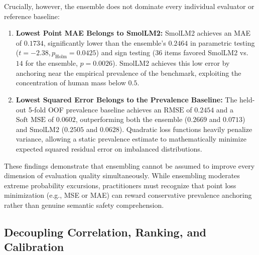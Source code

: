 Crucially, however, the ensemble does not dominate every individual evaluator or reference baseline:
\begin{enumerate}
    \item \textbf{Lowest Point MAE Belongs to SmolLM2:} SmolLM2 achieves an MAE of $0.1734$, significantly lower than the ensemble's $0.2464$ in parametric testing ($t=-2.38, p_{\text{Holm}}=0.0425$) and sign testing ($36$ items favored SmolLM2 vs. $14$ for the ensemble, $p=0.0026$). SmolLM2 achieves this low error by anchoring near the empirical prevalence of the benchmark, exploiting the concentration of human mass below $0.5$.
    \item \textbf{Lowest Squared Error Belongs to the Prevalence Baseline:} The held-out 5-fold OOF prevalence baseline achieves an $\text{RMSE}$ of $0.2454$ and a $\text{Soft MSE}$ of $0.0602$, outperforming both the ensemble ($0.2669$ and $0.0713$) and SmolLM2 ($0.2505$ and $0.0628$). Quadratic loss functions heavily penalize variance, allowing a static prevalence estimate to mathematically minimize expected squared residual error on imbalanced distributions.
\end{enumerate}

These findings demonstrate that ensembling cannot be assumed to improve every dimension of evaluation quality simultaneously. While ensembling moderates extreme probability excursions, practitioners must recognize that point loss minimization (e.g., MSE or MAE) can reward conservative prevalence anchoring rather than genuine semantic safety comprehension.

\subsection{Decoupling Correlation, Ranking, and Calibration}
\label{subsec:disc_correlation_ranking_calibration}


